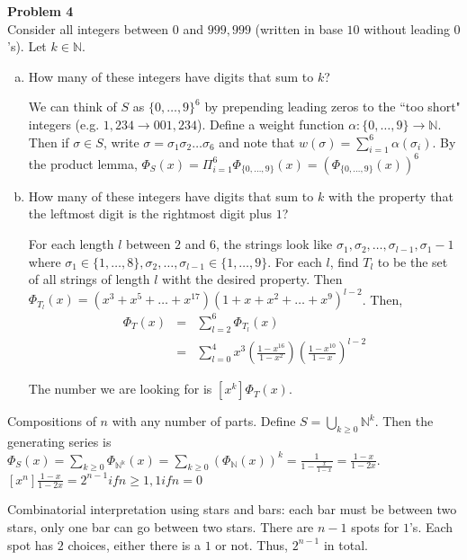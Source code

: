 \documentclass{article}
\begin{document}
\textbf{Problem 4}\\
Consider all integers between $0$ and $999,999$ (written in base $10$ without leading $0$'s). Let $k \in \mathbb{N}$. 
\begin{enumerate}[a)]
	\item How many of these integers have digits that sum to $k$?
	
	We can think of $S$ as $\{0, \dots, 9 \}^6$ by prepending leading zeros to the ``too short" integers (e.g. $1,234 \rightarrow 001,234$). Define a weight function $\alpha : \{0, \dots, 9\} \rightarrow \mathbb{N}$. Then if $\sigma \in S$, write $\sigma = \sigma_1 \sigma_2 \dots \sigma_6$ and note that $w(\sigma) = \sum_{i = 1}^6 \alpha(\sigma_i)$. By the product lemma, $\Phi_S(x) = \Pi_{i=1}^6 \Phi_{\{0, \dots, 9 \}}(x) = \left( \Phi_{\{0, \dots, 9 \}}(x)\right)^6$


\item How many of these integers have digits that sum to $k$ with the property that the leftmost digit is the rightmost digit plus $1$?

For each length $l$ between $2$ and $6$, the strings look like $\sigma_1, \sigma_2, \dots , \sigma_{l-1}, \sigma_1-1$ where $\sigma_1 \in \{1, \dots, 8\}, \sigma_2, \dots , \sigma_{l-1} \in \{1, \dots , 9\}$. For each $l$, find $T_l$ to be the set of all strings of length $l$ witht the desired property. Then $\Phi_{T_l}(x) = (x^3 + x^5 + \dots + x^{17})(1+x+x^2+ \dots + x^9)^{l-2}$. Then, 
\begin{eqnarray*}
	\Phi_{T}(x) &=& \sum_{l=2}^6 \Phi_{T_l}(x)\\
	&=& \sum_{l=0}^4 x^3 \left( \frac{1-x^{16}}{1-x^2} \right) \left( \frac{1-x^{10}}{1-x} \right)^{l-2} 
\end{eqnarray*}

The number we are looking for is $[x^k]\Phi_T(x)$.

\end{enumerate}

Compositions of $n$ with any number of parts. Define $S= \bigcup_{k \ge 0}\mathbb{N}^k$. Then the generating series is $\Phi_S(x) = \sum_{k \ge 0}\Phi_{\mathbb{N^k}}(x) = \sum_{k \ge 0}\left( \Phi_{\mathbb{N}}(x) \right )^k = \frac{1}{1-\frac{x}{1-x}} = \frac{1-x}{1-2x}$. $[x^n]\frac{1-x}{1-2x} = 2^{n-1} if n \ge 1, 1 if n=0$ %

Combinatorial interpretation using stars and bars: each bar must be between two stars, only one bar can go between two stars. There are $n-1$ spots for $1$'s. Each spot has $2$ choices, either there is a $1$ or not. Thus, $2^{n-1}$ in total.
\end{document}

